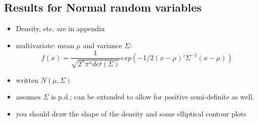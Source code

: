 \subsection{Results for Normal random variables}
\begin{itemize}
\item Density, etc. are in \citet{CaB_2001} appendix
\item multivariate: mean $\mu$ and variance $\Sigma$:
      \[ f(x) = \frac{1}{\sqrt{2^n \pi^n det(\Sigma)}} exp(-1/2(x -
      \mu)'\Sigma^{-1}(x- \mu)) \]
\item written $N(\mu, \Sigma)$
\item assumes $\Sigma$ is p.d.; can be extended to allow for positive
      semi-definite as well.
\item you should draw the shape of the density and some elliptical
      contour plots
\end{itemize}

